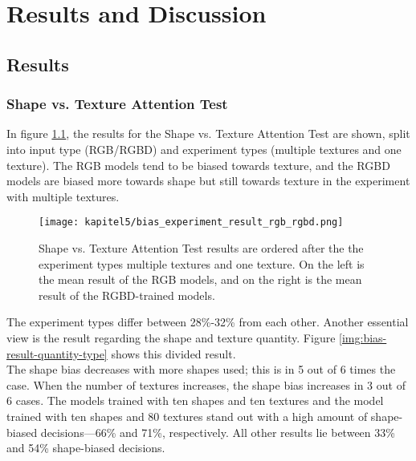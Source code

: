 \chapter{Results and Discussion}
\label{chap:kapitel5}

	\section{Results}
	\label{sec:results}
	
		\subsection{Shape vs. Texture Attention Test}
			In figure \ref{img:bias-result-input-type}, the results for the Shape vs. Texture Attention Test are shown, split into input type (RGB/RGBD) and experiment types (multiple textures and one texture). The RGB models tend to be biased towards texture, and the RGBD models are biased more towards shape but still towards texture in the experiment with multiple textures.
			\begin{figure}[h]
				\centering
				\texttt{[image: kapitel5/bias\_experiment\_result\_rgb\_rgbd.png]}
				\caption[Shape vs. Texture Attention Test results are ordered after the the experiment types multiple textures and one texture. On the left is the mean result of the RGB models, and on the right is the mean result of the RGBD-trained models.]{Shape vs. Texture Attention Test results are ordered after the the experiment types multiple textures and one texture. On the left is the mean result of the RGB models, and on the right is the mean result of the RGBD-trained models.}
				\label{img:bias-result-input-type}
			\end{figure}
			\FloatBarrier
			
			The experiment types differ between 28\%-32\% from each other.
			\clearpage
			Another essential view is the result regarding the shape and texture quantity. Figure \ref{img:bias-result-quantity-type} shows this divided result.\\
			The shape bias decreases with more shapes used; this is in 5 out of 6 times the case. When the number of textures increases, the shape bias increases in 3 out of 6 cases. The models trained with ten shapes and ten textures and the model trained with ten shapes and 80 textures stand out with a high amount of shape-biased decisions—66\% and 71\%, respectively. All other results lie between 33\% and 54\%  shape-biased decisions.
			
